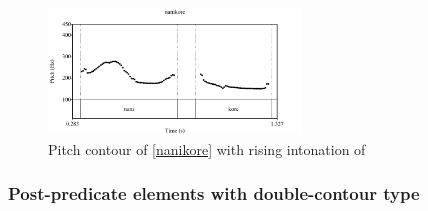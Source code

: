 \begin{figure}
	\begin{center}
	\includegraphics[width=0.6\textwidth]{sounds/nanikore_rise.pdf}
	\caption{Pitch contour of  \ref{nanikore} with rising intonation of }
	\label{nanikore_riseF}
	\end{center}
\end{figure}

\subsubsection{Post-predicate elements with double-contour type}\label{WO:PostP:Motiv:Double}

